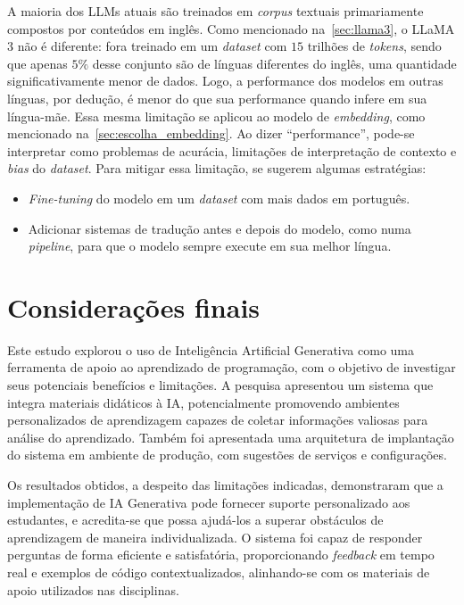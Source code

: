 \documentclass[journal]{IEEEtran}
\begin{document}
A maioria dos LLMs atuais são treinados em \textit{corpus} textuais primariamente compostos por conteúdos em inglês.
Como mencionado na~\cref{sec:llama3}, o LLaMA 3 não é diferente: fora treinado em um \textit{dataset} com $15$ trilhões de \textit{tokens}, sendo que apenas $5\%$ desse conjunto são de línguas diferentes do inglês, uma quantidade significativamente menor de dados.
Logo, a performance dos modelos em outras línguas, por dedução, é menor do que sua performance quando infere em sua língua-mãe.
Essa mesma limitação se aplicou ao modelo de \textit{embedding}, como mencionado na~\cref{sec:escolha_embedding}.
Ao dizer ``performance'', pode-se interpretar como problemas de acurácia, limitações de interpretação de contexto e \textit{bias} do \textit{dataset}.
Para mitigar essa limitação, se sugerem algumas estratégias:

\begin{itemize}
    \item \textit{Fine-tuning} do modelo em um \textit{dataset} com mais dados em português.
    \item Adicionar sistemas de tradução antes e depois do modelo, como numa \textit{pipeline}, para que o modelo sempre execute em sua melhor língua.
\end{itemize}

\section{Considerações finais\label{sec:conclusao}}

\noindent%
Este estudo explorou o uso de Inteligência Artificial Generativa como uma ferramenta de apoio ao aprendizado de programação, com o objetivo de investigar seus potenciais benefícios e limitações.
A pesquisa apresentou um sistema que integra materiais didáticos à IA, potencialmente promovendo ambientes personalizados de aprendizagem capazes de coletar informações valiosas para análise do aprendizado.
Também foi apresentada uma arquitetura de implantação do sistema em ambiente de produção, com sugestões de serviços e configurações.

Os resultados obtidos, a despeito das limitações indicadas, demonstraram que a implementação de IA Generativa pode fornecer suporte personalizado aos estudantes, e acredita-se que possa ajudá-los a superar obstáculos de aprendizagem de maneira individualizada.
O sistema foi capaz de responder perguntas de forma eficiente e satisfatória, proporcionando \textit{feedback} em tempo real e exemplos de código contextualizados, alinhando-se com os materiais de apoio utilizados nas disciplinas.
\end{document}
